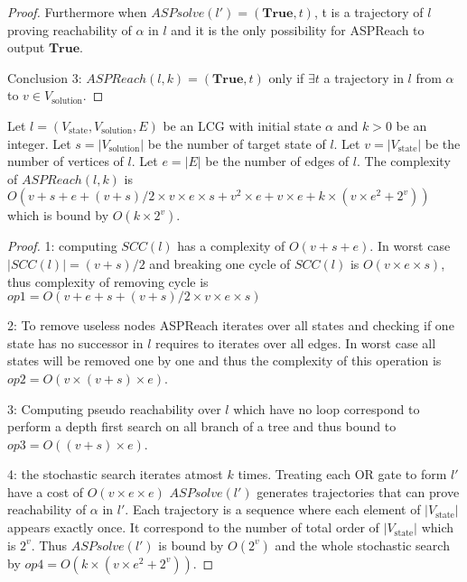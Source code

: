 \begin{theorem}
\begin{proof}
        
        
        Furthermore when $ASPsolve(l')=(\mathbf{True},t)$, t is a trajectory of $l$ proving reachability of $\alpha$ in $l$ and it is the only possibility for ASPReach to output $\mathbf{True}$.
        
        Conclusion 3: $ASPReach(l,k)=(\mathrm{\mathbf{True}},t)$ only if $\exists t$ a trajectory in $l$ from $\alpha$ to $v \in V_{\mathrm{solution}}$.
    \end{proof}
\end{theorem}

\begin{theorem}
    Let $l=(V_{\mathrm{state}},V_{\mathrm{solution}}, E)$ be an LCG with initial state $\alpha$ and $k > 0$ be an integer.
    Let $s=|V_{\mathrm{solution}}|$ be the number of target state of $l$.
    Let $v = |V_{\mathrm{state}}|$ be the number of vertices of $l$.
    Let $e=|E|$ be the number of edges of $l$.
    The complexity of $ASPReach(l,k)$ is $O(v + s + e + (v+s) / 2 \times v \times e \times s + v^{2} \times e + v \times e + k \times (v \times e^{2} + 2^{v}))$ which is bound by $O(k \times 2^{v})$.
    \begin{proof}
    
        1: computing $SCC(l)$ has a complexity of $O(v + s + e)$.
        In worst case $|SCC(l)| = (v+s) / 2$ and breaking one cycle of $SCC(l)$ is $O(v \times e \times s)$, thus complexity of removing cycle is $op1=O(v+ e + s + (v+s) / 2 \times v \times e \times s)$
        
        2: To remove useless nodes ASPReach iterates over all states and checking if one state has no successor in $l$ requires to iterates over all edges.
        In worst case all states will be removed one by one and thus the complexity of this operation is $op2=O(v \times (v+s) \times e)$.
        
        3: Computing pseudo reachability over $l$ which have no loop correspond to perform a depth first search on all branch of a tree and thus bound to $op3=O((v+s) \times e)$.
        
        4: the stochastic search iterates atmost $k$ times.
        Treating each OR gate to form $l'$ have a cost of $O(v \times e \times e)$
        $ASPsolve(l')$ generates trajectories that can prove reachability of $\alpha$ in $l'$.
        Each trajectory is a sequence where each element of $|V_{\mathrm{state}}|$ appears exactly once.
        It correspond to the number of total order of $|V_{\mathrm{state}}|$ which is $2^{v}$.
        Thus $ASPsolve(l')$ is bound by $O(2^{v})$ and the whole stochastic search by $op4=O(k \times (v \times e^{2} + 2^{v}))$.
        

\end{proof}
\end{theorem}

